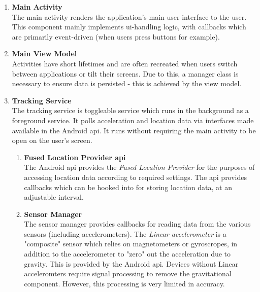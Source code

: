 \begin{enumerate}
\item \textbf{Main Activity}\\
The main activity renders the application's main user interface to the user.
This component mainly implements \Ac{ui}-handling logic, with callbacks which are primarily event-driven (when users press buttons for example).
\item \textbf{Main View Model}\\
Activities have short lifetimes and are often recreated when users switch between applications or tilt their screens.
Due to this, a manager class is necessary to ensure data is persisted - this is achieved by the view model.
\item \textbf{Tracking Service}\\
The tracking service is toggleable service which runs in the background as a foreground service.
It polls acceleration and location data via interfaces made available in the Android \ac{api}.
It runs without requiring the main activity to be open on the user's screen.
\begin{enumerate}
\item \textbf{Fused Location Provider \ac{api}}\\
The Android \ac{api} provides the \textit{Fused Location Provider} for the purposes of accessing location data according to required settings.
The \ac{api} provides callbacks which can be hooked into for storing location data, at an adjustable interval.

\item \textbf{Sensor Manager}\\
The sensor manager provides callbacks for reading data from the various sensors (including accelerometers).
The \textit{Linear accelerometer} is a "composite" sensor which relies on magnetometers or gyroscropes, in addition to the accelerometer to "zero" out the acceleration due to gravity.
This is provided by the Android \ac{api}.
Devices without Linear acceleromters require signal processing to remove the gravitational component. However, this processing is very limited in accuracy.


\end{enumerate}
\end{enumerate}

